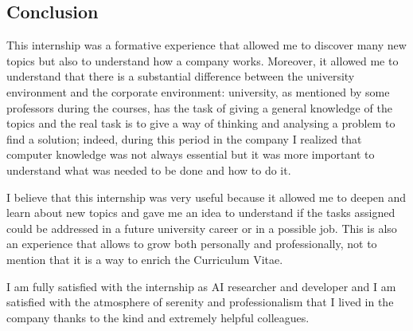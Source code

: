 \documentclass[14pt]{extarticle}
\def\sp{\vspace{5pt}}
\def\ss{\vspace{25pt}}
\def\ppn{\vspace{10pt}}
\begin{document}
\newpage
\begin{center}
	\section{Conclusion}
	\sp
\end{center}
\begin{flushleft}

This internship was a formative experience that allowed me to discover many new topics but also to understand how a company works. Moreover, it allowed me to understand that there is a substantial difference between the university environment and the corporate environment: university, as mentioned by some professors during the courses, has the task of giving a general knowledge of the topics and the real task is to give a way of thinking and analysing a problem to find a solution; indeed, during this period in the company I realized that computer knowledge was not always essential but it was more important to understand what was needed to be done and how to do it.
\ppn

I believe that this internship was very useful because it allowed me to deepen and learn about new topics and gave me an idea to understand if the tasks assigned could be addressed in a future university career or in a possible job.
\newline
This is also an experience that allows to grow both personally and professionally, not to mention that it is a way to
enrich the Curriculum Vitae.

\ppn
I am fully satisfied with the internship as AI researcher and developer and I am satisfied with the atmosphere of serenity and professionalism that I lived in the company thanks to the kind and extremely helpful colleagues.
	\ss
\end{flushleft}
\end{document}
